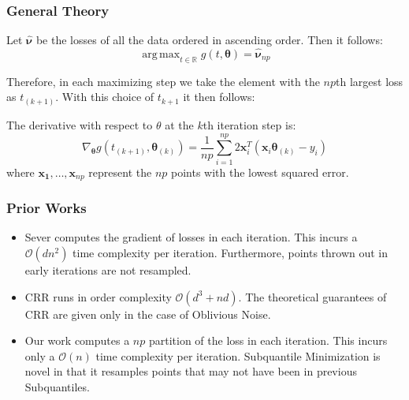 \documentclass[
11pt, %
serif
]{beamer}
\DeclareMathOperator*{\argmax}{arg\,max}
\begin{document}
	\begin{frame}
		\frametitle{General Theory}
		
		\begin{lemma}
			Let $\hat{\boldsymbol{\nu}}$ be the losses of all the data ordered in ascending order. Then it follows:
			\begin{equation}
				\argmax_{t \in \mathbb{R}}g(t,\boldsymbol{\theta}) = \hat{\boldsymbol{\nu}}_{np}
			\end{equation}
		\end{lemma}
		Therefore, in each maximizing step we take the element with the $np$th largest loss as $t_{(k+1)}$. With this choice of $t_{k+1}$ it then follows:
		\begin{lemma}
			The derivative with respect to $\theta$ at the $k$th iteration step is:
			\begin{equation*}
				\nabla_{\boldsymbol{\theta}}g(t_{(k+1)},\boldsymbol{\theta}_{(k)}) = \frac{1}{np}\sum_{i=1}^{np}2\boldsymbol{x}_i^T (\boldsymbol{x}_i \boldsymbol{\theta}_{(k)} - y_i)
			\end{equation*}
			where $\boldsymbol{x_1},\dots,\boldsymbol{x}_{np}$ represent the $np$ points with the lowest squared error.
		\end{lemma}
		
	\end{frame}
	
	\begin{frame}
		\frametitle{Prior Works }
		\begin{itemize}
			\item[\ding{228}]
			\cite{DiakonikolasKKLSS19} Sever computes the gradient of losses in each iteration. This incurs a $\mathcal{O}(dn^2)$ time complexity per iteration. Furthermore, points thrown out in early iterations are not resampled. 
			\item[\ding{228}]
			\cite{bhatia2017} CRR runs in order complexity $\mathcal{O}(d^3 + nd)$. The theoretical guarantees of CRR are given only in the case of Oblivious Noise.
			\item[\ding{228}] 
			Our work computes a $np$ partition of the loss in each iteration. This incurs only a $\mathcal{O}(n)$ time complexity per iteration. Subquantile Minimization is novel in that it resamples points that may not have been in previous Subquantiles.
		\end{itemize}
		
	\end{frame}
	
	
	
\end{document}
